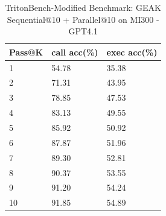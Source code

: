 \begin{table}
 \caption{TritonBench-Modified Benchmark: GEAK Sequential@10 + Parallel@10 on MI300 - GPT4.1}
  \centering
  \begin{tabular}{lll}
    \toprule
    Pass@K & call acc(\%) & exec acc(\%) \\
       \midrule
    1 & 54.78 & 35.38 \\
    2 & 71.31 & 43.95 \\
    3 & 78.85 & 47.53 \\
    4 & 83.13 & 49.55 \\
    5 & 85.92 & 50.92 \\
    6 & 87.87 & 51.96 \\
    7 & 89.30 & 52.81 \\
    8 & 90.37 & 53.55 \\
    9 & 91.20 & 54.24 \\
    10 & 91.85 & 54.89 \\
   
    \bottomrule
  \end{tabular}
  \label{tab:parallel_scaling_tritonbench_mi300}
\end{table}